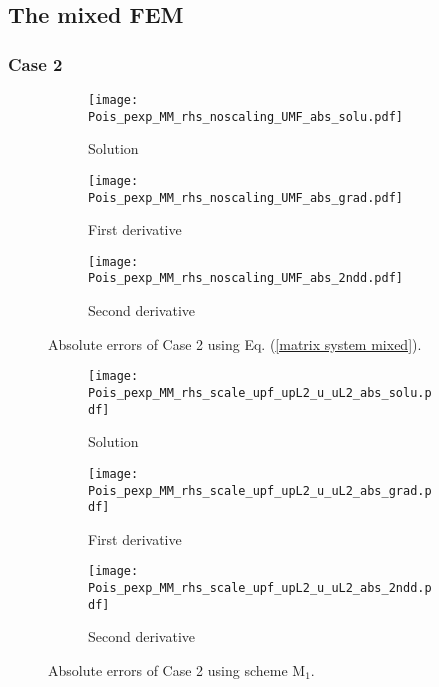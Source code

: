 \documentclass[final,3p]{elsarticle}
\begin{document}
\subsection{The mixed FEM}

\subsubsection{Case 2}

\begin{figure}[!ht]
    \begin{subfigure}{5.5cm}
        \texttt{[image: Pois\_pexp\_MM\_rhs\_noscaling\_UMF\_abs\_solu.pdf]}
        \caption{Solution}
        \label{Fig:Pois_pexp_MM_rhs_noscaling_UMF_abs_solu}
    \end{subfigure}
    \begin{subfigure}{5.5cm}
        \texttt{[image: Pois\_pexp\_MM\_rhs\_noscaling\_UMF\_abs\_grad.pdf]}
        \caption{First derivative}
        \label{Fig:Pois_pexp_MM_rhs_noscaling_UMF_abs_grad}
    \end{subfigure}
    \begin{subfigure}{5.5cm}
        \texttt{[image: Pois\_pexp\_MM\_rhs\_noscaling\_UMF\_abs\_2ndd.pdf]}
        \caption{Second derivative}
        \label{Fig:Pois_pexp_MM_rhs_noscaling_UMF_abs_2ndd}
    \end{subfigure}
\caption{Absolute errors of Case 2 using Eq. (\ref{matrix system mixed}).}
\label{Pois_pexp_MM_rhs_noscaling_UMF_abs}
\end{figure}

\begin{figure}[!ht]
    \begin{subfigure}{5.5cm}
        \texttt{[image: Pois\_pexp\_MM\_rhs\_scale\_upf\_upL2\_u\_uL2\_abs\_solu.pdf]}
        \caption{Solution}
        \label{Fig:Pois_pexp_MM_rhs_scale_upf_upL2_u_uL2_abs_solu}
    \end{subfigure}
    \begin{subfigure}{5.5cm}
        \texttt{[image: Pois\_pexp\_MM\_rhs\_scale\_upf\_upL2\_u\_uL2\_abs\_grad.pdf]}
        \caption{First derivative}
        \label{Fig:Pois_pexp_MM_rhs_scale_upf_upL2_u_uL2_abs_grad}
    \end{subfigure}
    \begin{subfigure}{5.5cm}
        \texttt{[image: Pois\_pexp\_MM\_rhs\_scale\_upf\_upL2\_u\_uL2\_abs\_2ndd.pdf]}
        \caption{Second derivative}
        \label{Fig:Pois_pexp_MM_rhs_scale_upf_upL2_u_uL2_abs_2ndd}
    \end{subfigure}
\caption{Absolute errors of Case 2 using scheme $\text{M}_1$.}
\label{Pois_pexp_MM_rhs_scale_upf_upL2_u_uL2_abs}
\end{figure}
\end{document}
